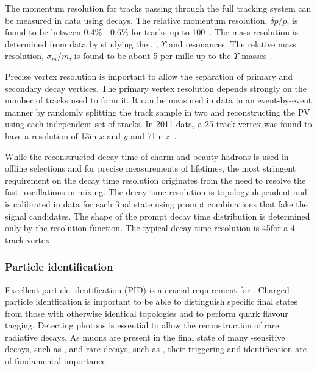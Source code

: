 The momentum resolution for tracks passing through the full tracking system can be measured in data using \decay{\jpsi}{\mumu} decays. The relative momentum resolution, $\delta p/p$, is found to be between 0.4\% - 0.6\% for tracks up to 100\gevc~\cite{LHCb-DP-2014-002}. The mass resolution is determined from data by studying the \jpsi, \psitwos, $\Upsilon$ and \Z resonances. The relative mass resolution, $\sigma_{m}/m$, is found to be about 5 per mille up to the $\Upsilon$ masses~\cite{LHCb-DP-2014-002}.

Precise vertex resolution is important to allow the separation of primary and secondary decay vertices. The primary vertex resolution depends strongly on the number of tracks used to form it. It can be measured in data in an event-by-event manner by randomly splitting the track sample in two and reconstructing the PV using each independent set of tracks. In 2011 data, a 25-track vertex was found to have a resolution of 13\mum in $x$ and $y$ and 71\mum in $z$~\cite{LHCb-DP-2014-002}.
 
While the reconstructed decay time of charm and beauty hadrons is used in offline selections and for precise measurements of lifetimes, the most stringent requirement on the decay time resolution originates from the need to resolve the fast \Bs-\Bsb oscillations in mixing. The decay time resolution is topology dependent and is calibrated in data for each final state using prompt combinations that fake the signal candidates. The shape of the prompt decay time distribution is determined only by the resolution function. The typical decay time resolution is 45\fs for a 4-track vertex~\cite{LHCb-DP-2014-002}.

\subsubsection{Particle identification}
\label{sec:lhcb:pid}

Excellent particle identification (PID) is a crucial requirement for \lhcb. Charged particle identfication is important to be able to distinguish specific final states from those with otherwise identical topologies and to perform \bquark quark flavour tagging. Detecting photons is essential to allow the reconstruction of rare radiative decays. As muons are present in the final state of many \CP-sensitive decays, such as \BsToJPsiPhi, and rare decays, such as \BsToMuMu, their triggering and identification are of fundamental importance.

